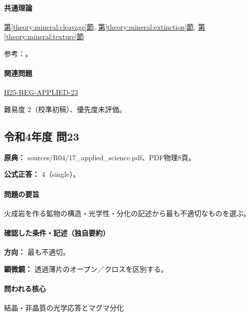\paragraph{共通理論} \hyperref[theory:mineral:cleavage]{第\ref*{theory:mineral:cleavage}節}, \hyperref[theory:mineral:extinction]{第\ref*{theory:mineral:extinction}節}, \hyperref[theory:mineral:texture]{第\ref*{theory:mineral:texture}節}

\par 参考：\cite{hom_quartz,hom_biotite,hom_forsterite,nelson_inosilicates,nelson_biaxial}。

\paragraph{関連問題} \hyperref[q:h25-reg-applied-23]{H25-REG-APPLIED-23}

\par 難易度 2（校準初稿）、優先度未評価。

\subsection{令和4年度 問23}
\label{q:r04-reg-applied-23}

\noindent\textbf{原典：} sources/R04/17\_applied\_science.pdf、PDF物理8頁。

\textbf{公式正答：} 4（single）。

\paragraph{問題の要旨} 火成岩を作る鉱物の構造・光学性・分化の記述から最も不適切なものを選ぶ。

\paragraph{確認した条件・記述（独自要約）}\mbox{}\par

\noindent\textbf{方向：} 最も不適切。\par

\noindent\textbf{顕微鏡：} 透過薄片のオープン／クロスを区別する。\par

\paragraph{問われる核心} 結晶・非晶質の光学応答とマグマ分化

